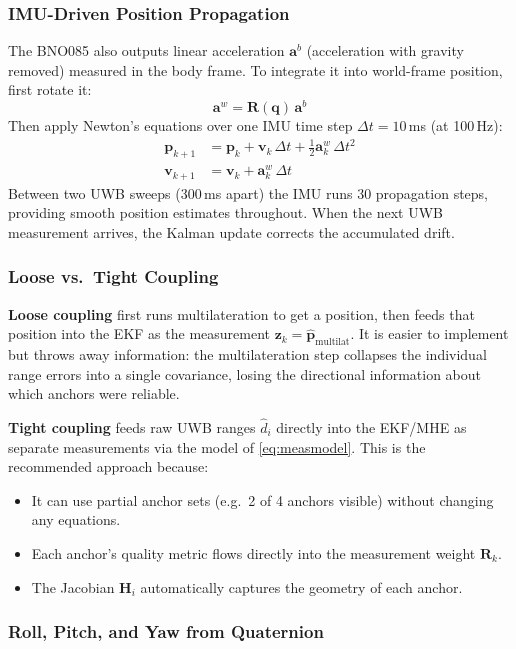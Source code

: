 \documentclass[11pt,a4paper]{article}
\newcommand{\vect}[1]{\bm{#1}}
\newcommand{\mat}[1]{\mathbf{#1}}
\begin{document}
\subsubsection{IMU-Driven Position Propagation}

The BNO085 also outputs linear acceleration $\vect{a}^b$ (acceleration with gravity removed) measured in the body frame. To integrate it into world-frame position, first rotate it:
\[
\vect{a}^w = \mat{R}(\vect{q})\,\vect{a}^b
\]
Then apply Newton's equations over one IMU time step $\Delta t = 10$\,ms (at 100\,Hz):
\begin{align}
\vect{p}_{k+1} &= \vect{p}_k + \vect{v}_k\,\Delta t + \tfrac{1}{2}\vect{a}^w_k\,\Delta t^2 \\
\vect{v}_{k+1} &= \vect{v}_k + \vect{a}^w_k\,\Delta t
\end{align}
Between two UWB sweeps (300\,ms apart) the IMU runs 30 propagation steps, providing smooth position estimates throughout. When the next UWB measurement arrives, the Kalman update corrects the accumulated drift.

\subsubsection{Loose vs.\ Tight Coupling}

\textbf{Loose coupling} first runs multilateration to get a position, then feeds that position into the EKF as the measurement $\vect{z}_k = \hat{\vect{p}}_\text{multilat}$. It is easier to implement but throws away information: the multilateration step collapses the individual range errors into a single covariance, losing the directional information about which anchors were reliable.

\textbf{Tight coupling} feeds raw UWB ranges $\hat{d}_i$ directly into the EKF/MHE as separate measurements via the model of \cref{eq:measmodel}. This is the recommended approach because:
\begin{itemize}[leftmargin=2em]
  \item It can use partial anchor sets (e.g.\ 2 of 4 anchors visible) without changing any equations.
  \item Each anchor's quality metric flows directly into the measurement weight $\mat{R}_k$.
  \item The Jacobian $\mat{H}_i$ automatically captures the geometry of each anchor.
\end{itemize}

\subsubsection{Roll, Pitch, and Yaw from Quaternion}
\end{document}
